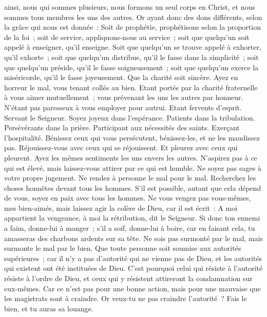 \begin{multicols}{2}
ainsi, nous qui sommes plusieurs, nous formons un seul corps en Christ, et nous sommes tous membres les uns des autres.
Or ayant donc des dons différents, selon la grâce qui nous est donnée~: Soit de prophétie, prophétisons selon la proportion de la foi~;
soit de service, appliquons-nous au service~; soit que quelqu'un soit appelé à enseigner, qu'il enseigne.
Soit que quelqu'un se trouve appelé à exhorter, qu'il exhorte~; soit que quelqu'un distribue, qu'il le fasse dans la simplicité~; soit que quelqu'un préside, qu'il le fasse soigneusement~; soit que quelqu'un exerce la miséricorde, qu'il le fasse joyeusement.
Que la charité soit sincère. Ayez en horreur le mal, vous tenant collés au bien.
Etant portés par la charité fraternelle à vous aimer mutuellement~; vous prévenant les uns les autres par honneur.
N'étant pas paresseux à vous employer pour autrui. Etant fervents d'esprit. Servant le Seigneur.
Soyez joyeux dans l'espérance. Patients dans la tribulation. Persévérants dans la prière.
Participant aux nécessités des saints. Exerçant l'hospitalité.
Bénissez ceux qui vous persécutent, bénissez-les, et ne les maudissez pas.
Réjouissez-vous avec ceux qui se réjouissent. Et pleurez avec ceux qui pleurent.
Ayez les mêmes sentiments les uns envers les autres. N'aspirez pas à ce qui est élevé, mais laissez-vous attirer par ce qui est humble. Ne soyez pas sages à votre propre jugement.
Ne rendez à personne le mal pour le mal. Recherchez les choses honnêtes devant tous les hommes.
S'il est possible, autant que cela dépend de vous, soyez en paix avec tous les hommes.
Ne vous vengez pas vous-mêmes, mes bien-aimés, mais laissez agir la colère de Dieu, car il est écrit~: A moi appartient la vengeance, à moi la rétribution, dit le Seigneur.
Si donc ton ennemi a faim, donne-lui à manger~; s'il a soif, donne-lui à boire, car en faisant cela, tu amasseras des charbons ardents sur sa tête.
Ne sois pas surmonté par le mal, mais surmonte le mal par le bien.
\VerseOne{}Que toute personne soit soumise aux autorités supérieures~; car il n'y a pas d'autorité qui ne vienne pas de Dieu, et les autorités qui existent ont été instituées de Dieu.
C'est pourquoi celui qui résiste à l'autorité résiste à l'ordre de Dieu, et ceux qui y résistent attireront la condamnation sur eux-mêmes.
Car ce n'est pas pour une bonne action, mais pour une mauvaise que les magistrats sont à craindre. Or veux-tu ne pas craindre l'autorité~? Fais le bien, et tu auras sa louange.

\end{multicols}
